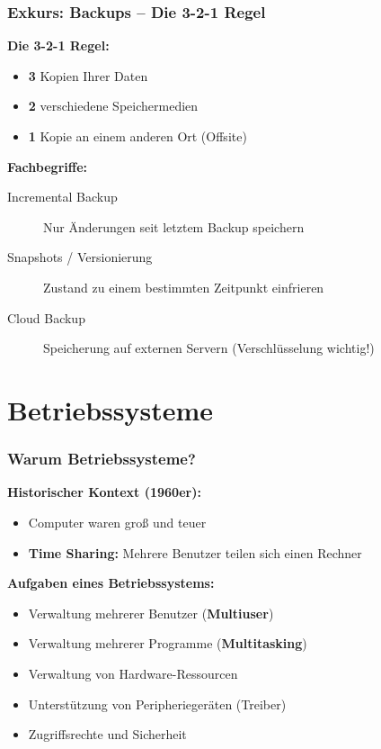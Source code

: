 \documentclass[aspectratio=169]{beamer}
\begin{document}
\begin{frame}
  \frametitle{Exkurs: Backups -- Die 3-2-1 Regel}
  \textbf{Die 3-2-1 Regel:}
  \begin{itemize}
    \item \textbf{3} Kopien Ihrer Daten
    \item \textbf{2} verschiedene Speichermedien
    \item \textbf{1} Kopie an einem anderen Ort (Offsite)
  \end{itemize}
  \vspace{5mm}
  \textbf{Fachbegriffe:}
  \begin{description}
    \item[Incremental Backup] Nur Änderungen seit letztem Backup speichern
    \item[Snapshots / Versionierung] Zustand zu einem bestimmten Zeitpunkt einfrieren
    \item[Cloud Backup] Speicherung auf externen Servern (Verschlüsselung wichtig!)
  \end{description}
\end{frame}

\section{Betriebssysteme}

\begin{frame}
  \frametitle{Warum Betriebssysteme?}
  \textbf{Historischer Kontext (1960er):}
  \begin{itemize}
    \item Computer waren groß und teuer
    \item \textbf{Time Sharing:} Mehrere Benutzer teilen sich einen Rechner
  \end{itemize}
  \vspace{5mm}
  \textbf{Aufgaben eines Betriebssystems:}
  \begin{itemize}
    \item Verwaltung mehrerer Benutzer (\textbf{Multiuser})
    \item Verwaltung mehrerer Programme (\textbf{Multitasking})
    \item Verwaltung von Hardware-Ressourcen
    \item Unterstützung von Peripheriegeräten (Treiber)
    \item Zugriffsrechte und Sicherheit
  \end{itemize}
\end{frame}
\end{document}
